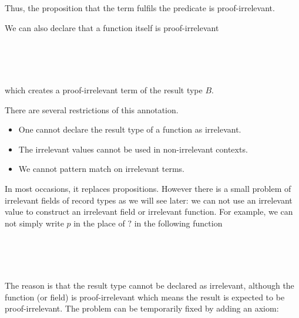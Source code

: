 Thus, the proposition that the term fulfils the predicate is proof-irrelevant. 

We can also declare  that a function itself is proof-irrelevant

\begin{code}
%
\\
\> \AgdaSymbol{:}   \<%
\\
\>  \AgdaSymbol{=} \<%
\\
\end{code}

which creates a proof-irrelevant term of the result type $B$.

There are several restrictions of this annotation.

\begin{itemize}

 \item One cannot declare the result type of a function as irrelevant. 

 \item The irrelevant values cannot be used in non-irrelevant contexts.

 \item We cannot pattern match on irrelevant terms. 
\end{itemize}

In most occasions, it replaces propositions. However there is a small problem of irrelevant fields of record types as we will see later: we can not use an irrelevant value to construct an irrelevant field or irrelevant function. For example, we can not simply write $p$ in the place of $?$ in the following function

\begin{code}
%
\\
\> \AgdaSymbol{:}  \AgdaSymbol{:} \AgdaSymbol{\}\{}  \AgdaSymbol{:} \AgdaSymbol{\}}    \AgdaSymbol{)}    \<%
\\
\>  \AgdaSymbol{=} \<%
\\
\end{code}

The reason is that the result type cannot be declared as irrelevant, although the function (or field) is proof-irrelevant which means the result is expected to be proof-irrelevant. The problem can be temporarily fixed by adding an axiom:

